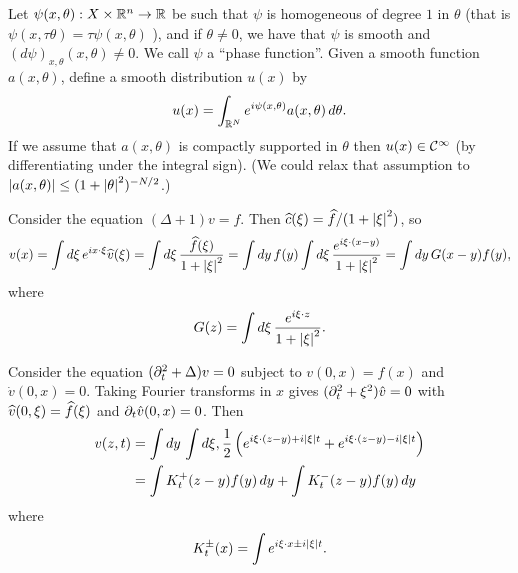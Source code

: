 Let $\psi(x,\theta): X \times \mathbb{R}^n \to \mathbb{R}$ be such that $\psi$ is homogeneous of degree $1$ in $\theta$ (that is $\psi(x,\tau\theta)=\tau\psi(x,\theta)$ ), and if $\theta\neq0$, we have that $\psi$ is smooth and $(d\psi)_{x,\theta}(x,\theta)\neq0$.
We call $\psi$ a ``phase function''.
Given a smooth function $a(x,\theta)$, define a smooth distribution $u(x)$ by
\begin{equation}
  u(x) = \int_{\mathbb{R}^N} e^{i\psi(x,\theta)}a(x,\theta)\,d\theta.
  \label{20:star}
\end{equation}
If we assume that $a(x,\theta)$ is compactly supported in $\theta$ then $u(x)\in\mathcal{C}^\infty$ (by differentiating under the integral sign).
(We could relax that assumption to $\left\lvert a(x,\theta) \right\rvert\leq(1+\left\lvert \theta \right\rvert^2)^{-N/2}$.)

\begin{exam}
  Consider the equation $(\Delta+1)v=f$.
  Then $\widehat c(\xi) = \widehat f/(1+\left\lvert \xi \right\rvert^2)$, so
  \[ v(x) = \int d\xi\, e^{ix\cdot\xi}\widehat v(\xi) = \int d\xi\, \frac{\widehat f(\xi)}{1+\left\lvert \xi \right\rvert^2} = \int dy\, f(y) \int d\xi\, \frac{e^{i\xi\cdot(x-y)}}{1+\left\lvert \xi \right\rvert^2} = \int dy\, G(x-y)f(y), \]
  where
  \[ G(z) = \int d\xi\, \frac{e^{i\xi\cdot z}}{1+\left\lvert \xi \right\rvert^2}. \]
\end{exam}

\begin{exam}
  Consider the equation $(\partial_t^2+\Delta)v=0$ subject to $v(0,x)=f(x)$ and $\dot v(0,x)=0$.
  Taking Fourier transforms in $x$ gives $(\partial_t^2+\xi^2)\hat v=0$ with $\widehat v(0,\xi)=\widehat f(\xi)$ and $\partial_t\hat v(0,x)=0$.
  Then
  \begin{align*}
    v(z,t) &= \int dy\, \int d\xi, \frac12\left( e^{i\xi\cdot(z-y)+i\left\lvert \xi \right\rvert t} + e^{i\xi\cdot(z-y)-i\left\lvert \xi \right\rvert t} \right) \\
    &= \int K_t^+(z-y) f(y) \, dy + \int K_t^-(z-y) f(y) \, dy
  \end{align*}
  where
  \[ K_t^\pm(x) = \int e^{i\xi\cdot x\pm i\left\lvert \xi \right\rvert t}. \]
\end{exam}
